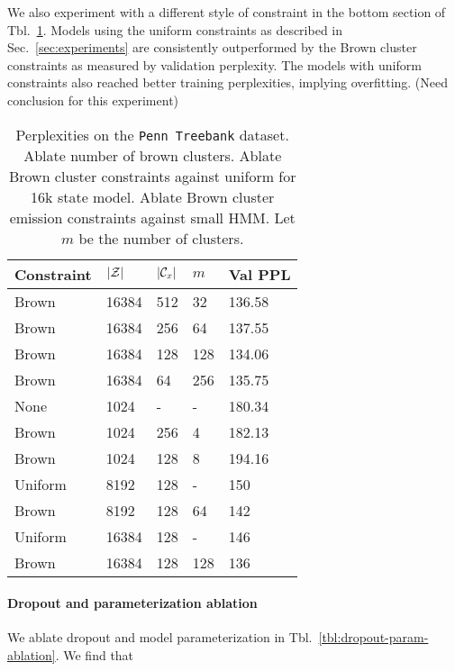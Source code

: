 \documentclass[11pt,a4paper]{article}
\begin{document}
We also experiment with a different style of constraint in the
bottom section of Tbl.~\ref{tbl:constraint-ablation}.
Models using the uniform constraints as described in Sec.~\ref{sec:experiments}
are consistently outperformed by the Brown cluster constraints
as measured by validation perplexity.
The models with uniform constraints also reached better training perplexities,
implying overfitting.
(Need conclusion for this experiment)

\begin{table}[!t]
\centering
\caption{\label{tbl:constraint-ablation}
Perplexities on the \texttt{Penn Treebank} dataset.
Ablate number of brown clusters.
Ablate Brown cluster constraints against uniform for 16k state model.
Ablate Brown cluster emission constraints against small HMM.
Let $m$ be the number of clusters.
}
\begin{tabular}{lllll}
\toprule
Constraint & $|\mathcal{Z}|$ & $|\mathcal{C}_x|$ & $m$ & Val PPL\\
\midrule
Brown & 16384 & 512 & 32  & 136.58\\
Brown & 16384 & 256 & 64  & 137.55\\
Brown & 16384 & 128 & 128 & 134.06\\
Brown & 16384 & 64  & 256 & 135.75\\
\midrule
None  & 1024 & - & - & 180.34\\
Brown & 1024 & 256 & 4 & 182.13\\
Brown & 1024 & 128 & 8 & 194.16\\
\midrule
Uniform    & 8192    & 128    & -   & 150\\
Brown      & 8192    & 128    & 64  & 142\\
Uniform    & 16384   & 128    & -   & 146\\
Brown      & 16384   & 128    & 128 & 136\\
\bottomrule
\end{tabular}
\end{table}

\paragraph{Dropout and parameterization ablation}
We ablate dropout and model parameterization in Tbl.~\ref{tbl:dropout-param-ablation}.
We find that 
\end{document}
